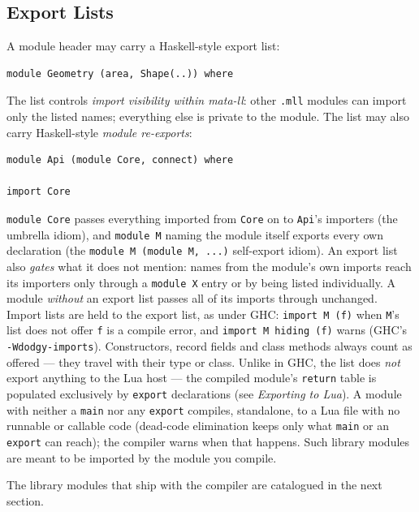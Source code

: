 \documentclass[11pt,a4paper]{article}
\begin{document}
\subsection{Export Lists}

A module header may carry a Haskell-style export list:

\begin{lstlisting}
module Geometry (area, Shape(..)) where
\end{lstlisting}

The list controls \emph{import visibility within mata-ll}: other
\texttt{.mll} modules can import only the listed names; everything
else is private to the module.  The list may also carry
Haskell-style \emph{module re-exports}:

\begin{lstlisting}
module Api (module Core, connect) where

import Core
\end{lstlisting}

\texttt{module Core} passes everything imported from \texttt{Core} on
to \texttt{Api}'s importers (the umbrella idiom), and \texttt{module M}
naming the module itself exports every own declaration (the
\texttt{module M (module M, ...)} self-export idiom).  An export list
also \emph{gates} what it does not mention: names from the module's own
imports reach its importers only through a \texttt{module X} entry or
by being listed individually.  A module \emph{without} an export list
passes all of its imports through unchanged.  Import lists are held to
the export list, as under GHC: \texttt{import M (f)} when
\texttt{M}'s list does not offer \texttt{f} is a compile error, and
\texttt{import M hiding (f)} warns (GHC's
\texttt{-Wdodgy-imports}).  Constructors, record fields and class
methods always count as offered --- they travel with their type or
class.  Unlike in GHC, the list
does \emph{not} export anything to the Lua host --- the compiled
module's \texttt{return} table is populated exclusively by
\texttt{export} declarations (see \emph{Exporting to Lua}).  A module with neither a
\texttt{main} nor any \texttt{export} compiles, standalone, to a Lua
file with no runnable or callable code (dead-code elimination keeps
only what \texttt{main} or an \texttt{export} can reach); the
compiler warns when that happens.  Such library modules are meant to
be imported by the module you compile.

The library modules that ship with the compiler are catalogued in the
next section.
\end{document}
